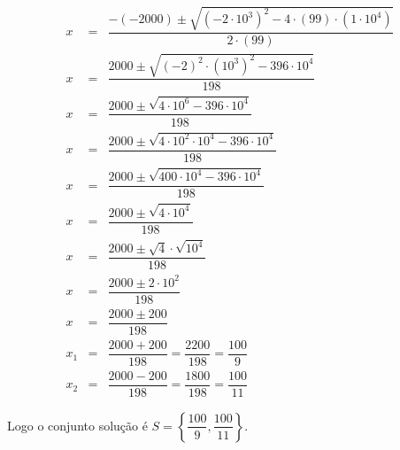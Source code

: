\begin{exem}
\begin{enumerate}[1)]
 \begin{eqnarray*}
 x &=& \dfrac{-(-2000) \pm \sqrt{(-2 \cdot 10^3)^2 - 4 \cdot (99) \cdot (1 \cdot 10^4)}}{2 \cdot (99)} \\
 x &=& \dfrac{ 2000 \pm \sqrt{(-2)^2 \cdot (10^3)^2 - 396 \cdot 10^4}}{198} \\
 x &=& \dfrac{ 2000 \pm \sqrt{4 \cdot 10^6 - 396 \cdot 10^4}}{198} \\
 x &=& \dfrac{ 2000 \pm \sqrt{4 \cdot 10^2 \cdot 10^4 - 396 \cdot 10^4}}{198} \\
 x &=& \dfrac{ 2000 \pm \sqrt{400 \cdot 10^4 - 396 \cdot 10^4}}{198} \\
 x &=& \dfrac{ 2000 \pm \sqrt{4 \cdot 10^4}}{198} \\
 x &=& \dfrac{ 2000 \pm \sqrt{4} \cdot \sqrt{10^4}}{198} \\
 x &=& \dfrac{ 2000 \pm 2 \cdot 10^2}{198} \\
 x &=& \dfrac{ 2000 \pm 200}{198} \\
 x_1 &=& \dfrac{ 2000 + 200}{198} = \dfrac{2200}{198} = \dfrac{100}{9} \\
 x_2 &=& \dfrac{ 2000 - 200}{198} = \dfrac{1800}{198} = \dfrac{100}{11}
 \end{eqnarray*}

 Logo o conjunto solução é $S= \left\{ \dfrac{100}{9}, \dfrac{100}{11} \right\}$.

 \end{enumerate}
 \end{exem}

\vskip0.3cm

